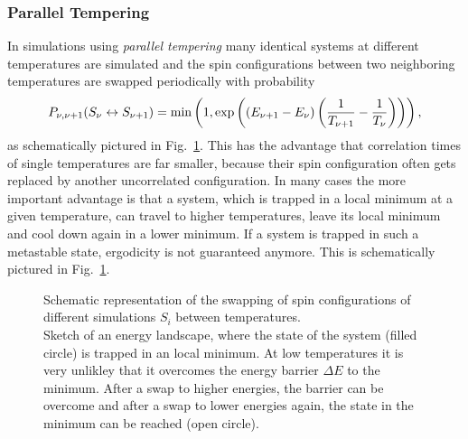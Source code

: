     \subsubsection{Parallel Tempering}
        In simulations using \emph{parallel tempering} \cite{ParallelTempering1986}
        many identical systems at different temperatures are simulated and
        the spin configurations between two neighboring temperatures are
        swapped periodically with probability \cite[p. 169ff]{NewmanBarkema1999} \cite[p. 155ff]{Katzgraber2011}
        \begin{equation}
            P_{\nu,\nu+1}(S_\nu \leftrightarrow S_{\nu+1}) = \min\left(1,\exp\left(\left(E_{\nu+1}-E_\nu\right)\left(\frac{1}{T_{\nu+1}}-\frac{1}{T_\nu}\right)\right)\right),
            \label{eq:partemp}
        \end{equation}
        as schematically pictured in Fig.\ \ref{fig:parTemp}.
        This has the advantage that correlation times of single
        temperatures are far smaller, because their spin configuration
        often gets replaced by another uncorrelated configuration. In
        many cases the more important advantage is that a system, which
        is trapped in a local minimum at a given temperature, can travel
        to higher temperatures, leave its local minimum and cool down
        again in a lower minimum. If a system is trapped in such a
        metastable state, ergodicity is not guaranteed anymore.
        This is schematically pictured in Fig.\ \ref{fig:parTemp}.
        \begin{figure}[htbp]
            \centering
            \caption[Visualisation of the Parallel Tempering Algorithm]
            {
                 Schematic representation of
                the swapping of spin configurations of different simulations \(S_i\)
                between temperatures.\\
                 Sketch of an energy landscape, where
                the state of the system (filled circle) is trapped in an local
                minimum. At low temperatures it is very unlikley that it
                overcomes the energy barrier \(\Delta E\) to the minimum.
                After a swap to higher energies, the barrier can be overcome
                and after a swap to lower energies again, the state in
                the minimum can be reached (open circle).
            }
            \label{fig:parTemp}
        \end{figure}\\
